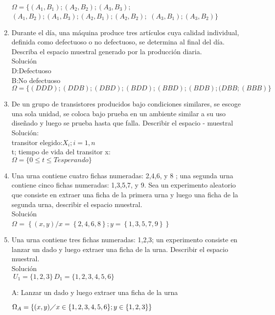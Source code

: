 \documentclass[12pt]{article}
\begin{document}
\begin{enumerate}
$\Omega =\lbrace (A_1,B_1);(A_2,B_2);(A_3,B_3);$
$(A_1,B_2);(A_1,B_3);(A_2,B_1);(A_2,B_2);$
$(A_3,B_1);(A_3,B_2) \rbrace$


\item Durante el día, una máquina produce tres artículos cuya calidad individual, definida como defectuoso o no defectuoso, se determina al final del día. Describa el espacio muestral generado por la producción diaria.\\
Solución\\

D:Defectuoso\\
B:No defectuoso\\

$\Omega =\lbrace(DDD);(DDB);(DBD);(BDD);(BBD);(BDB);(DBB;(BBB)\rbrace$


\item De un grupo de transistores producidos bajo condiciones similares, se escoge una sola unidad, se coloca bajo prueba en un ambiente similar a su uso diseñado y luego se prueba hasta que falla. Describir el espacio - muestral\\
Solución:\\
transitor elegido:$ X_i; i=1,n$\\
t; tiempo de vida del transitor x:\\
$\Omega = \lbrace 0\leqslant t \leqslant Tesperando \rbrace  $


\item Una urna contiene cuatro fichas numeradas: 2,4,6, y 8 ; una segunda urna contiene cinco fichas numeradas: 1,3,5,7, y 9. Sea un experimento aleatorio que consiste en extraer una ficha de la primera urna y luego una ficha de la segunda urna, describir el espacio muestral.\\
Solución\\
$\Omega$ = $\left\lbrace (x,y)/x=\left\lbrace 2,4,6,8\right\rbrace; y = \left\lbrace 1,3,5,7,9\right\rbrace\right\rbrace$

\item Una urna contiene tres fichas numeradas: 1,2,3; un experimento consiste en lanzar un dado y luego extraer una ficha de la urna. Describir el espacio muestral.\\
Solución\\
$\ U_{1}=\lbrace1,2,3\rbrace       \,   D_{1}=\lbrace1,2,3,4,5,6\rbrace$

A: Lanzar un dado y luego extraer una ficha de la urna 

$\Omega_{A}=\lbrace (x,y) \diagup x \in \lbrace1,2,3,4,5,6\rbrace ;  y \in \lbrace1,2,3\rbrace \rbrace$



\end{enumerate}
\end{document}
